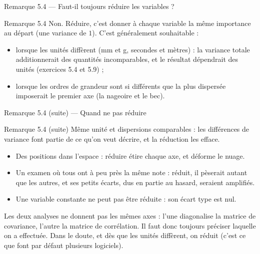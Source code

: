 \begin{frame}{Remarque 5.4 --- Faut-il toujours réduire les variables ?}
  \begin{Rem}{Remarque 5.4}
    Non. Réduire, c'est donner à chaque variable la même importance au
    départ (une variance de $1$). C'est généralement souhaitable :
    \begin{itemize}
      \item lorsque les unités diffèrent (mm et g, secondes et mètres) : la
        variance totale additionnerait des quantités incomparables, et le
        résultat dépendrait des unités (exercices 5.4 et 5.9) ;
      \item lorsque les ordres de grandeur sont si différents que la plus
        dispersée imposerait le premier axe (la nageoire et le bec).
    \end{itemize}
  \end{Rem}
\end{frame}

\begin{frame}{Remarque 5.4 (suite) --- Quand ne pas réduire}
  \begin{Rem}{Remarque 5.4 (suite)}
    Même unité et dispersions comparables : les différences de variance
    font partie de ce qu'on veut décrire, et la réduction les efface.
    \begin{itemize}
      \item Des positions dans l'espace : réduire étire chaque axe, et
        déforme le nuage.
      \item Un examen où tous ont à peu près la même note : réduit, il
        pèserait autant que les autres, et ses petits écarts, dus en partie
        au hasard, seraient amplifiés.
      \item Une variable constante ne peut pas être réduite : son écart type
        est nul.
    \end{itemize}
    Les deux analyses ne donnent pas les mêmes axes : l'une diagonalise la
    matrice de covariance, l'autre la matrice de corrélation. Il faut donc
    toujours préciser laquelle on a effectuée. Dans le doute, et dès que les
    unités diffèrent, on réduit (c'est ce que font par défaut plusieurs
    logiciels).
  \end{Rem}
\end{frame}


